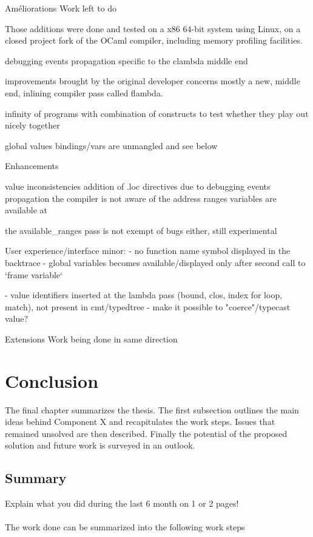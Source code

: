 Améliorations
Work left to do

Those additions were done and tested on a x86 64-bit system using Linux, on a
closed project fork of the OCaml compiler, including memory profiling facilities.

debugging events propagation specific to the clambda middle end

improvements brought by the original developer concerns mostly a
new, middle end, inlining compiler pass called flambda.

infinity of programs with combination of constructs to test whether they play
out nicely together


global values bindings/vars are unmangled and see below

Enhancements

value inconsistencies
addition of .loc directives due to debugging events propagation the compiler is not aware of
the address ranges variables are available at

the available\_ranges pass is not exempt of bugs either, still experimental

User experience/interface minor:
- no function name symbol displayed in the backtrace
- global variables becomes available/displayed only after second call to `frame variable`

- value identifiers inserted at the lambda pass (bound, clos, index for loop,
match), not present in cmt/typedtree
- make it possible to "coerce"/typecast value?

Extensions
Work being done in same direction

\chapter{Conclusion\label{cha:chapter5}}
The final chapter summarizes the thesis. The first subsection outlines the main ideas behind Component X and recapitulates the work steps. Issues that remained unsolved are then described. Finally the potential of the proposed solution and future work is surveyed in an outlook.

\section{Summary\label{sec:summary}}

Explain what you did during the last 6 month on 1 or 2 pages!
\\
\\
\noindent The work done can be summarized into the following work steps


